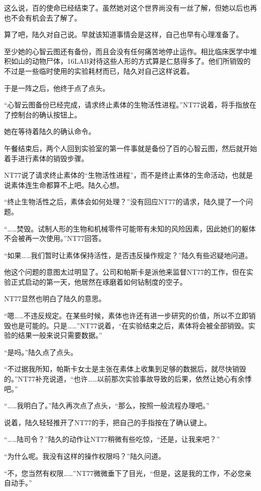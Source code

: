 这么说，百的使命已经结束了。虽然她对这个世界尚没有一丝了解，但她以后也再也不会有机会去了解了。

算了吧，陆久对自己说。早就该知道事情会是这样，自己也早有心理准备了。

至少她的心智云图还有备份，而且会没有任何痛苦地停止运作。相比临床医学中堆积如山的动物尸体，16LAB对待这些人形的方式算是仁慈得多了。他们所销毁的不过是一些临时使用的实验耗材而已，陆久对自己这样说着。

于是一阵之后，他终于点了点头。

“心智云图备份已经完成，请求终止素体的生物活性进程。”NT77说着，将手指放在了控制台的确认按钮上。

她在等待着陆久的确认命令。

午餐结束后，两个人回到实验室的第一件事就是备份了百的心智云图，然后就开始着手进行素体的销毁步骤。

NT77说了请求终止素体的“生物活性进程”，而不是终止素体的生命活动，也就是说素体连生命都算不上吧。陆久心想。

“终止生物活性之后，素体会如何处理？”没有回应NT77的请求，陆久提了一个问题。

“……焚毁。试制人形的生物和机械零件可能带有未知的风险因素，因此她们的躯体不会被再一次使用。”NT77回答。

“如果……我们暂时让素体保持活性，是否违反操作规定？”陆久有些迟疑地问道。

他这个问题的意图太过明显了。公司和帕斯卡是派他来监督NT77的工作，但在实验正式启动的第一天，他居然在琢磨着如何钻制度的空子。

NT77显然也明白了陆久的意思。

“嗯……不违反规定。在某些时候，素体也许还有进一步研究的价值，所以不立即销毁也是可能的。只是……”NT77说着，“在实验结束之后，素体将会被全部销毁。实验的结果一般来说只需要数据。”

“是吗。”陆久点了点头。

“不过据我所知，帕斯卡女士是主张在素体上收集到足够的数据后，就尽快销毁的。”NT77补充说道，“也许……以前那次实验事故导致的后果，依然让她心有余悸吧。”

“……我明白了。”陆久再次点了点头，“那么，按照一般流程办理吧。”

说着，陆久轻轻推开了NT77的手，把自己的手指按在了确认键上。

“……陆司令？”陆久的动作让NT77稍微有些吃惊，“还是，让我来吧？”

“为什么呢。我没有这样的操作权限吗？”陆久问道。

“不，您当然有权限……”NT77微微垂下了目光，“但是，这是我的工作，不必您亲自动手。”


